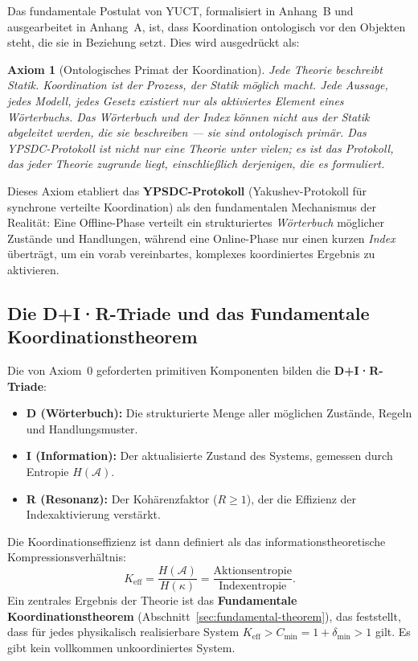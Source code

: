 \documentclass[11pt,a4paper]{article}
\newtheorem{axiom}{Axiom}
\begin{document}
	Das fundamentale Postulat von YUCT, formalisiert in Anhang~B und ausgearbeitet in Anhang~A, ist, dass Koordination ontologisch vor den Objekten steht, die sie in Beziehung setzt. Dies wird ausgedrückt als:
	
	\begin{axiom}[Ontologisches Primat der Koordination]
		Jede Theorie beschreibt Statik. Koordination ist der Prozess, der Statik möglich macht. Jede Aussage, jedes Modell, jedes Gesetz existiert nur als aktiviertes Element eines Wörterbuchs. Das Wörterbuch und der Index können nicht aus der Statik abgeleitet werden, die sie beschreiben — sie sind ontologisch primär. Das YPSDC-Protokoll ist nicht nur eine Theorie unter vielen; es ist das Protokoll, das jeder Theorie zugrunde liegt, einschließlich derjenigen, die es formuliert.
	\end{axiom}
	
	Dieses Axiom etabliert das \textbf{YPSDC-Protokoll} (Yakushev-Protokoll für synchrone verteilte Koordination) als den fundamentalen Mechanismus der Realität: Eine Offline-Phase verteilt ein strukturiertes \textit{Wörterbuch} möglicher Zustände und Handlungen, während eine Online-Phase nur einen kurzen \textit{Index} überträgt, um ein vorab vereinbartes, komplexes koordiniertes Ergebnis zu aktivieren.
	
	\subsection{Die D+I·R-Triade und das Fundamentale Koordinationstheorem}
	\label{subsec:dir-triad}
	
	Die von Axiom~0 geforderten primitiven Komponenten bilden die \textbf{D+I·R-Triade}:
	\begin{itemize}
		\item \textbf{D (Wörterbuch):} Die strukturierte Menge aller möglichen Zustände, Regeln und Handlungsmuster.
		\item \textbf{I (Information):} Der aktualisierte Zustand des Systems, gemessen durch Entropie \(H(\mathcal{A})\).
		\item \textbf{R (Resonanz):} Der Kohärenzfaktor (\(R \geq 1\)), der die Effizienz der Indexaktivierung verstärkt.
	\end{itemize}
	Die Koordinationseffizienz ist dann definiert als das informationstheoretische Kompressionsverhältnis:
	\[
	K_{\mathrm{eff}} = \frac{H(\mathcal{A})}{H(\kappa)} = \frac{\text{Aktionsentropie}}{\text{Indexentropie}}.
	\]
	Ein zentrales Ergebnis der Theorie ist das \textbf{Fundamentale Koordinationstheorem} (Abschnitt~\ref{sec:fundamental-theorem}), das feststellt, dass für jedes physikalisch realisierbare System \(K_{\mathrm{eff}} > C_{\min} = 1 + \delta_{\min} > 1\) gilt. Es gibt kein vollkommen unkoordiniertes System.
	
\end{document}
